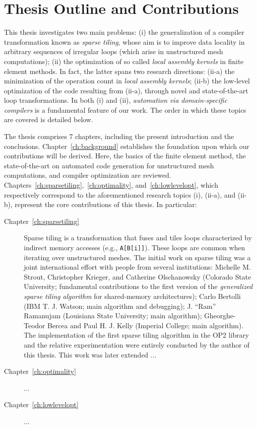 \section{Thesis Outline and Contributions}
\label{sec:contributions}
This thesis investigates two main problems: (i) the generalization of a compiler transformation known as {\em sparse tiling}, whose aim is to improve data locality in arbitrary sequences of irregular loops (which arise in unstructured mesh computations); (ii) the optimization of so called {\em local assembly kernels} in finite element methods. In fact, the latter spans two research directions: (ii-a) the minimization of the operation count in {\em local assembly kernels}; (ii-b) the low-level optimization of the code resulting from (ii-a), through novel and state-of-the-art loop transformations. In both (i) and (ii), {\it automation via domain-specific compilers} is a fundamental feature of our work. The order in which these topics are covered is detailed below.

The thesis comprises 7 chapters, including the present introduction and the conclusions. Chapter~\ref{ch:background} establishes the foundation upon which our contributions will be derived. Here, the basics of the finite element method, the state-of-the-art on automated code generation for unstructured mesh computations, and compiler optimization are reviewed. Chapters~\ref{ch:sparsetiling},~\ref{ch:optimality}, and~\ref{ch:lowlevelopt}, which respectively correspond to the aforementioned research topics (i), (ii-a), and (ii-b), represent the core contributions of this thesis. In particular:

\begin{description}
\item[Chapter~\ref{ch:sparsetiling}] Sparse tiling is a transformation that fuses and tiles loops characterized by indirect memory accesses (e.g., {\tt A[B[i]]}). These loops are common when iterating over unstructured meshes. The initial work on sparse tiling was a joint international effort with people from several institutions: Michelle M. Strout, Christopher Krieger, and Catherine Olschanowsky (Colorado State University; fundamental contributions to the first version of the {\em generalized sparse tiling algorithm} for shared-memory architectures); Carlo Bertolli (IBM T. J. Watson; main algorithm and debugging); J. ``Ram'' Ramanujam (Louisiana State University; main algorithm); Gheorghe-Teodor Bercea and Paul H. J. Kelly (Imperial College; main algorithm). The implementation of the first sparse tiling algorithm in the OP2 library and the relative experimentation were entirely conducted by the author of this thesis. This work was later extended ...

\item[Chapter~\ref{ch:optimality}] ...

\item[Chapter~\ref{ch:lowlevelopt}] ...

\end{description}

